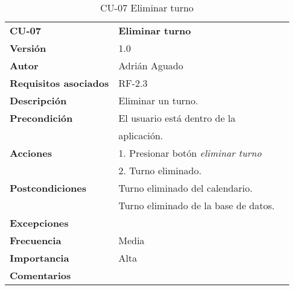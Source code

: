 \begin{table}[H]
\begin{tabular}{llr}  
\toprule
\begin{minipage}[b]{0.24\columnwidth}\raggedright\strut
\textbf{CU-07}\strut
\end{minipage} & \begin{minipage}[b]{0.72\columnwidth}\raggedright\strut
\textbf{Eliminar turno}\strut
\end{minipage}\tabularnewline
\cmidrule(r){1-2}
\textbf{Versión}       & 1.0           \\
\textbf{Autor}       & Adrián  Aguado    \\
\textbf{Requisitos asociados}       & RF-2.3 \\ 
\textbf{Descripción} & Eliminar un turno.\\
\textbf{Precondición} & El usuario está dentro de la \\
& aplicación.       \\
\textbf{Acciones} & 1. Presionar botón \emph{eliminar turno} \\
& 2. Turno eliminado. \\
\textbf{Postcondiciones} & Turno eliminado del calendario.\\
& Turno eliminado de la base de datos. \\
\textbf{Excepciones} &     \\
\textbf{Frecuencia} & Media          \\
\textbf{Importancia} & Alta            \\
\textbf{Comentarios } &      \\
\bottomrule
\end{tabular}
\caption{CU-07 Eliminar turno} 
\end{table}

